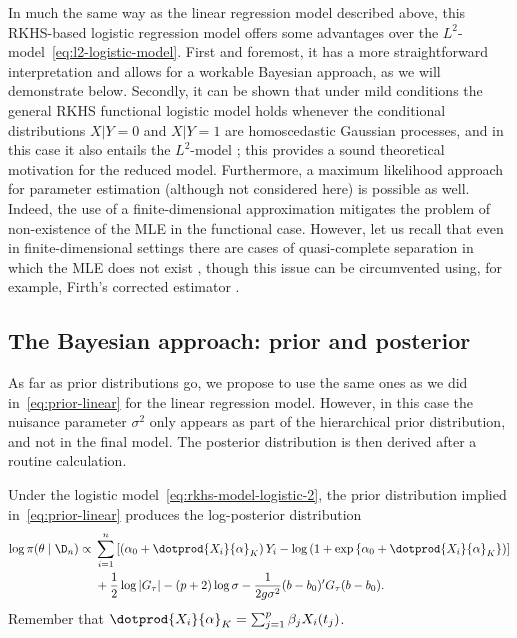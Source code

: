 In much the same way as the linear regression model described above, this RKHS-based logistic regression model offers some advantages over the \(L^2\)-model~\eqref{eq:l2-logistic-model}. First and foremost, it has a more straightforward interpretation and allows for a workable Bayesian approach, as we will demonstrate below. Secondly, it can be shown that under mild conditions the general RKHS functional logistic model holds whenever the conditional distributions \(X | Y=0\) and \(X|Y=1\) are homoscedastic Gaussian processes, and in this case it also entails the \(L^2\)-model \citep[see Theorem 1 in][]{berrendero2018functional}; this provides a sound theoretical motivation for the reduced model. Furthermore, a maximum likelihood approach for parameter estimation (although not considered here) is possible as well. Indeed, the use of a finite-dimensional approximation  mitigates the problem of non-existence of the MLE in the functional case. However, let us recall that even in finite-dimensional settings there are cases of quasi-complete separation in which the MLE does not exist \citep{albert1984existence}, though this issue can be circumvented using, for example, Firth's corrected estimator \citep{firth1993bias}.

\subsection*{The Bayesian approach: prior and posterior}

As far as prior distributions go, we propose to use the same ones as we did in~\eqref{eq:prior-linear} for the linear regression model. However, in this case the nuisance parameter \(\sigma^2\) only appears as part of the hierarchical prior distribution, and not in the final model. The posterior distribution is then derived after a routine calculation.

\begin{proposition}
Under the logistic model~\eqref{eq:rkhs-model-logistic-2}, the prior distribution implied in~\eqref{eq:prior-linear} produces the log-posterior distribution
\begin{align*}
  \log \pi(\theta \mid \D_n) \propto {} & \sum_{i=1}^n \left[ \left(\alpha_0 + \dotprod{X_i}{\alpha}_K\right)Y_i - \log\left(1 + \exp\left\{\alpha_0 + \dotprod{X_i}{\alpha}_K\right\}\right)\right]\\
  \quad &+ \frac{1}{2}\log |G_\tau| - (p+2)\log \sigma -\frac{1}{2g\sigma^2} (b - b_0)'G_\tau(b - b_0).
\end{align*}
Remember that \(\dotprod{X_i}{\alpha}_K = \sum_{j=1}^p \beta_j X_i(t_j)\).
\end{proposition}

